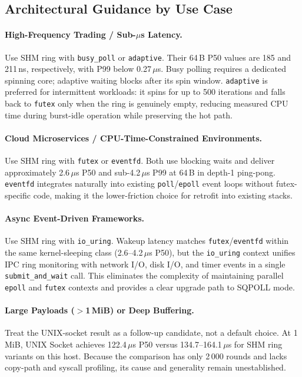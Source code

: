 \documentclass[10pt,conference]{IEEEtran}
\begin{document}
\subsection{Architectural Guidance by Use Case}

\paragraph{High-Frequency Trading / Sub-$\mu$s Latency.}
Use SHM ring with \texttt{busy\_poll} or \texttt{adaptive}.  Their 64\,B
P50 values are 185 and 211\,ns, respectively, with P99 below 0.27\,$\mu$s. Busy polling
requires a dedicated spinning core; adaptive waiting blocks after its spin window.
\texttt{adaptive} is preferred for intermittent workloads: it spins for up to
500 iterations and falls back to
\texttt{futex} only when the ring is genuinely empty, reducing measured CPU
time during burst-idle operation while preserving the hot path.

\paragraph{Cloud Microservices / CPU-Time-Constrained Environments.}
Use SHM ring with \texttt{futex} or \texttt{eventfd}.  Both use blocking
waits and deliver approximately 2.6\,$\mu$s P50 and sub-4.2\,$\mu$s P99 at
64\,B in depth-1 ping-pong. \texttt{eventfd} integrates naturally
into existing \texttt{poll}/\texttt{epoll} event loops without futex-specific
code, making it the lower-friction choice for retrofit into existing stacks.

\paragraph{Async Event-Driven Frameworks.}
Use SHM ring with \texttt{io\_uring}.  Wakeup latency matches
\texttt{futex}/\texttt{eventfd} within the same kernel-sleeping class
(2.6--4.2\,$\mu$s P50), but
the \texttt{io\_uring} context unifies IPC ring monitoring with network I/O,
disk I/O, and timer events in a single \texttt{submit\_and\_wait} call.  This
eliminates the complexity of maintaining parallel \texttt{epoll} and
\texttt{futex} contexts and provides a clear upgrade path to SQPOLL mode.

\paragraph{Large Payloads ($>$1\,MiB) or Deep Buffering.}
Treat the UNIX-socket result as a follow-up candidate, not a default choice.
At 1\,MiB, UNIX Socket achieves 122.4\,$\mu$s P50 versus 134.7--164.1\,$\mu$s
for SHM ring variants on this host.  Because the comparison has only 2\,000
rounds and lacks copy-path and syscall profiling, its cause and generality
remain unestablished.
\end{document}
